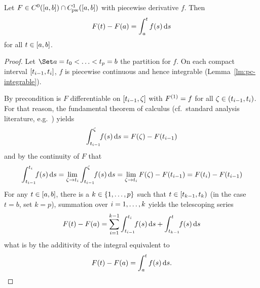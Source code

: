     \begin{lemma}\label{lm:pc-hauptsatz}
        Let $F\in\Cn[0]{\compactum{a}{b}}{} \cap \Cnpw[1]{\compactum{a}{b}}{}$
        with piecewise derivative $f$. Then
        \begin{equation*}
            F(t)-F(a) = \integral{a}{t} f(s)\dx[s]
        \end{equation*}
        for all $t\in\compactum{a}{b}$.
    \end{lemma}
    \begin{proof}
        Let $\partition{a=t_0}{t_p=b}$ the partition for $f$.
        On each compact interval $\compactum{t_{i-1}}{t_i}$, $f$ is piecewise continuous and hence integrable (Lemma~\ref{lm:pc-integrable}).

        By precondition is $F$ differentiable on $\compactum{t_{i-1}}{\zeta}$ with $\D{F}=f$ for all $\zeta\in\open{t_{i-1}}{t_i}$.
        For that reason, the fundamental theorem of calculus (cf.\ standard analysis literature, e.g.~\cite{Gathmann12GDM,Rudin76PrinciplesAnalysis}) yields
        \begin{equation*}
            \denseintegral{t_{i-1}}{\zeta} f(s)\dx[s] = F(\zeta)-F(t_{i-1})
        \end{equation*}
        and by the continuity of $F$ that
        \begin{equation*}
            \denseintegral{t_{i-1}}{t_i} f(s)\dx[s]
            = \lim_{\zeta\to t_i}\denseintegral{t_{i-1}}{\zeta} f(s)\dx[s]
            = \lim_{\zeta\to t_i} F(\zeta)-F(t_{i-1})
            = F(t_i)-F(t_{i-1})
        \end{equation*}
        For any $t\in\compactum{a}{b}$, there is a $k\in\set{\range{1}{p}}$ such that $t\in\closedopen{t_{k-1}}{t_k}$ (in the case $t=b$, set $k=p$), summation over $i=\range{1}{k}$ yields the telescoping series
        \begin{equation*}
            F(t)-F(a) = \sum_{i=1}^{k-1} \denseintegral{t_{i-1}}{t_i} f(s)\dx[s] + \denseintegral{t_{k-1}}{t} f(s)\dx[s]
        \end{equation*}
        what is by the additivity of the integral equivalent to
        \begin{equation*}
            F(t)-F(a) = \integral{a}{t} f(s)\dx[s].
        \end{equation*}
    \end{proof}


